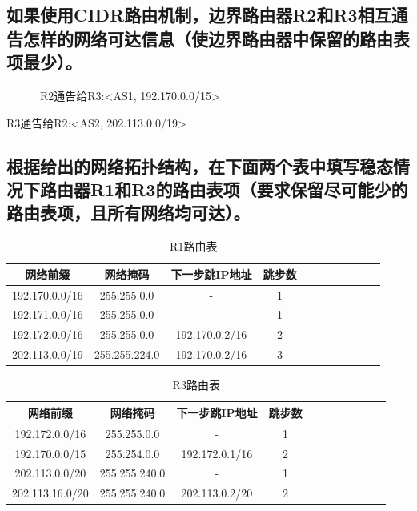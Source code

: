 \documentclass{article}
\begin{document}
\subsection{如果使用CIDR路由机制，边界路由器R2和R3相互通告怎样的网络可达信息（使边界路由器中保留的路由表项最少）。}
\ \ \ \ \ \ R2通告给R3:<AS1, 192.170.0.0/15>\\
\par R3通告给R2:<AS2, 202.113.0.0/19>
\subsection{根据给出的网络拓扑结构，在下面两个表中填写稳态情况下路由器R1和R3的路由表项（要求保留尽可能少的路由表项，且所有网络均可达）。}
\begin{table}[!htbp]
  \centering
  \begin{tabular}{ccccccccccc}
  \toprule  
  网络前缀&网络掩码& 下一步跳IP地址& 跳步数\\
  \midrule  
  192.170.0.0/16&255.255.0.0 & - &1\\
  192.171.0.0/16&255.255.0.0 & - &1\\
  192.172.0.0/16&255.255.0.0 & 192.170.0.2/16 &2\\
  202.113.0.0/19&255.255.224.0& 192.170.0.2/16 &3 \\
  \bottomrule
  \end{tabular}
  \caption{R1路由表}
\end{table}
\begin{table}[!htbp]
  \centering
  \begin{tabular}{ccccccccccc}
  \toprule  
  网络前缀&网络掩码& 下一步跳IP地址& 跳步数\\
  \midrule
  192.172.0.0/16&255.255.0.0 & -&1 \\
  192.170.0.0/15&255.254.0.0 & 192.172.0.1/16&2\\
  202.113.0.0/20&255.255.240.0 & -&1 \\
  202.113.16.0/20&255.255.240.0 & 202.113.0.2/20&2 \\
  \bottomrule
  \end{tabular}
  \caption{R3路由表}
\end{table}
\end{document}
